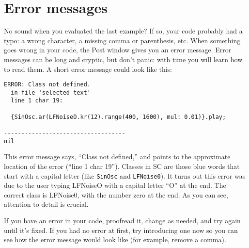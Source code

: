\section{Error messages}

No sound when you evaluated the last example? If so, your code probably had a typo: a wrong character, a missing comma or parenthesis, etc. When something goes wrong in your code, the Post window gives you an error message. Error messages can be long and cryptic, but don't panic: with time you will learn how to read them. A short error message could look like this:

\begin{verbatim}
ERROR: Class not defined.
  in file 'selected text'
  line 1 char 19:

  {SinOsc.ar(LFNoiseO.kr(12).range(400, 1600), mul: 0.01)}.play; 
                     
-----------------------------------
nil
\end{verbatim}

This error message says, ``Class not defined,'' and points to the approximate location of the error (``line 1 char 19''). Classes in SC are those blue words that start with a capital letter (like \texttt{SinOsc} and \texttt{LFNoise0}). It turns out this error was due to the user typing LFNoiseO with a capital letter ``O'' at the end. The correct class is LFNoise0, with the number zero at the end. As you can see, attention to detail is crucial.

If you have an error in your code, proofread it, change as needed, and try again until it's fixed. If you had no error at first, try introducing one now so you can see how the error message would look like (for example, remove a comma).

\bigskip
{}